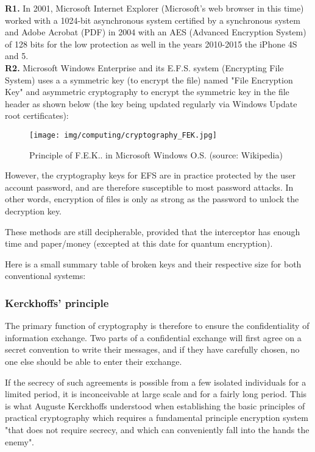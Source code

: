 		\begin{tcolorbox}[title=Remarks,colframe=black,arc=10pt]
		\textbf{R1.} In 2001, Microsoft Internet Explorer (Microsoft's web browser in this time) worked with a 1024-bit asynchronous system certified by a synchronous system and Adobe Acrobat (PDF) in 2004 with an AES (Advanced Encryption System) of 128 bits for the low protection as well in the years 2010-2015 the iPhone 4S and 5.\\
		
		\textbf{R2.} Microsoft Windows Enterprise and its E.F.S. system (Encrypting File System) uses a a symmetric key (to encrypt the file) named  "File Encryption Key" and asymmetric cryptography to encrypt the symmetric key in the file header as shown below (the key being updated regularly via Windows Update root certificates):
		\begin{figure}[H]
			\centering
			\texttt{[image: img/computing/cryptography\_FEK.jpg]}
			\caption{Principle of F.E.K.. in Microsoft Windows O.S. (source: Wikipedia)}
		\end{figure}
		However, the cryptography keys for EFS are in practice protected by the user account password, and are therefore susceptible to most password attacks. In other words, encryption of files is only as strong as the password to unlock the decryption key.
		\end{tcolorbox}
		These methods are still decipherable, provided that the interceptor has enough time and paper/money (excepted at this date for quantum encryption).
		
		Here is a small summary table of broken keys and their respective size for both conventional systems:
		
	
	\subsubsection{Kerckhoffs' principle}
	The primary function of cryptography is therefore to ensure the confidentiality of information exchange. Two parts of a confidential exchange will first agree on a secret convention to write their messages, and if they have carefully chosen, no one else should be able to enter their exchange.
	
	If the secrecy of such agreements is possible from a few isolated individuals for a limited period, it is inconceivable at  large scale and for a fairly long period. This is what Auguste Kerckhoffs understood when establishing the basic principles of practical cryptography which requires a fundamental principle encryption system "that does not require secrecy, and which can conveniently fall into the hands the enemy".
	
